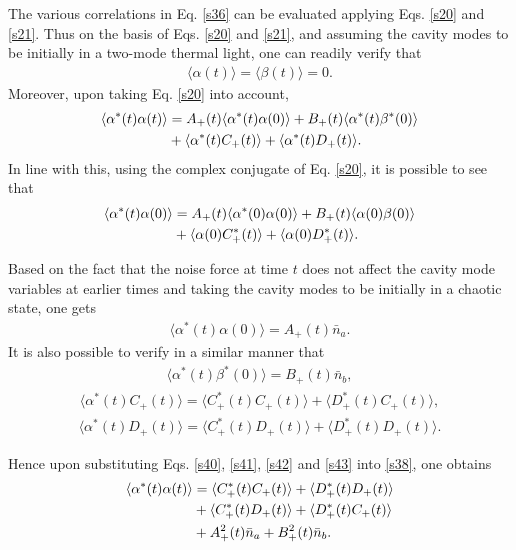 \documentclass[twocolumn,showpacs,preprintnumbers,amsmath,amssymb,pra]{revtex4}
\begin{document}
The various correlations in Eq. \eqref{s36} can be
evaluated applying Eqs. \eqref{s20} and \eqref{s21}. Thus on
the basis of Eqs. \eqref{s20} and  \eqref{s21}, and assuming the
cavity modes to be initially in a two-mode thermal light, one can
readily verify that
\begin{align}\label{s37}\langle\alpha(t)\rangle =
 \langle\beta(t)\rangle = 0.\end{align} 
Moreover, upon taking Eq. \eqref{s20} into account, 
\begin{align}\label{s38}\langle\alpha^{*}(t)\alpha(t)\rangle &=
A_{+}(t)\langle\alpha^{*}(t)\alpha(0)\rangle+B_{+}(t)\langle\alpha^{*}(t)\beta^{*}(0)\rangle
\notag\\&+ \langle\alpha^{*}(t)C_{+}(t)\rangle +
\langle\alpha^{*}(t)D_{+}(t)\rangle.\end{align} In line with this, using the complex
conjugate of Eq. \eqref{s20}, it is possible to see that
\begin{align}\label{s39}\langle\alpha^{*}(t)\alpha(0)\rangle &=
A_{+}(t)\langle\alpha^{*}(0)\alpha(0)\rangle+B_{+}(t)\langle\alpha(0)\beta(0)\rangle
\notag\\&+ \langle\alpha(0)C^{*}_{+}(t)\rangle +
\langle\alpha(0)D^{*}_{+}(t)\rangle.\end{align} 

Based on the fact that the noise force at time $t$ does not affect the
cavity mode variables at earlier times and taking the cavity modes to be initially in a chaotic  state, one gets
\begin{align}\label{s40}\langle\alpha^{*}(t)\alpha(0)\rangle
=A_{+}(t)\bar{n}_{a}.\end{align} It is also possible to verify in a similar manner
that
\begin{align}\label{s41}\langle\alpha^{*}(t)\beta^{*}(0)\rangle
=B_{+}(t)\bar{n}_{b},\end{align}
\begin{align}\label{s42}\langle\alpha^{*}(t)C_{+}(t)\rangle
=\langle C^{*}_{+}(t)C_{+}(t)\rangle+\langle
D^{*}_{+}(t)C_{+}(t)\rangle,\end{align}
\begin{align}\label{s43}\langle\alpha^{*}(t)D_{+}(t)\rangle
=\langle C^{*}_{+}(t)D_{+}(t)\rangle+\langle
D^{*}_{+}(t)D_{+}(t)\rangle.\end{align} 

Hence upon substituting
Eqs. \eqref{s40}, \eqref{s41}, \eqref{s42} and \eqref{s43} into
\eqref{s38}, one obtains
\begin{align}\label{s44}\langle\alpha^{*}(t)\alpha(t)\rangle &= \langle
C_{+}^{*}(t)C_{+}(t)\rangle + \langle D_{+}^{*}(t)D_{+}(t)\rangle
\notag\\&+\langle C^{*}_{+}(t)D_{+}(t)\rangle + \langle
D_{+}^{*}(t)C_{+}(t)\rangle\notag\\&+A_{+}^{2}(t)\bar{n}_{a}+B_{+}^{2}(t)\bar{n}_{b}. \end{align}
\end{document}
